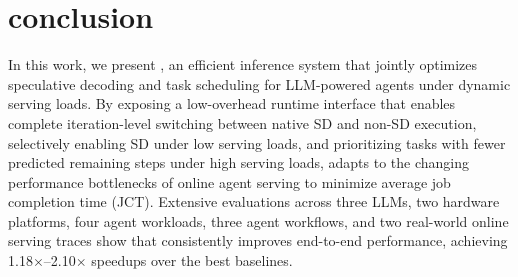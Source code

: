 \section{conclusion}
In this work, we present \sysname, an efficient inference system that jointly optimizes speculative decoding and task scheduling for LLM-powered agents under dynamic serving loads.
By exposing a low-overhead runtime interface that enables complete iteration-level switching between native SD and non-SD execution, selectively enabling SD under low serving loads, and prioritizing tasks with fewer predicted remaining steps under high serving loads, \sysname adapts to the changing performance bottlenecks of online agent serving to minimize average job completion time (JCT).
Extensive evaluations across three LLMs, two hardware platforms, four agent workloads, three agent workflows, and two real-world online serving traces show that \sysname consistently improves end-to-end performance, achieving 1.18$\times$--2.10$\times$ speedups over the best baselines.